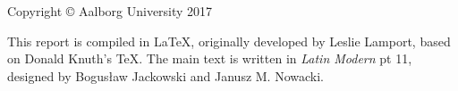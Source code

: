 \small
\strut\vfill %
\noindent Copyright \copyright{} Aalborg University 2017\par
\vspace{0.2cm}

\noindent This report is compiled in \LaTeX, originally developed by Leslie Lamport, based on Donald Knuth's \TeX. The main text is written in \emph{Latin Modern} pt 11, designed by Bogusław Jackowski and Janusz M. Nowacki.
\clearpage